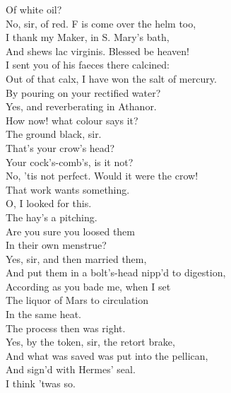 \documentclass{memoir}
\begin{document}
\begin{drama*}
\mammonspeaks {} Of white oil?\\
\subtlespeaks  No, sir, of red. F is come over the helm too,\\
 I thank my Maker, in S. Mary's bath,\\
 And shews lac virginis. Blessed be heaven!\\
 I sent you of his faeces there calcined:\\
 Out of that calx, I have won the salt of mercury.\\
\mammonspeaks  By pouring on your rectified water?\\
\subtlespeaks  Yes, and reverberating in Athanor.\\
 How now! what colour says it?\\
\facespeaks {} The ground black, sir.\\
\mammonspeaks  That's your crow's head?\\
\surlyspeaks {} Your cock's-comb's, is it not?\\
\subtlespeaks  No, 'tis not perfect. Would it were the crow!\\
 That work wants something.\\
\surlyspeaks {} O, I looked for this.\\
 The hay's a pitching.\\
\subtlespeaks {} Are you sure you loosed them\\
 In their own menstrue?\\
\facespeaks {} Yes, sir, and then married them,\\
 And put them in a bolt's-head nipp'd to digestion,\\
 According as you bade me, when I set\\
 The liquor of Mars to circulation\\
 In the same heat.\\
\subtlespeaks {} The process then was right.\\
\facespeaks  Yes, by the token, sir, the retort brake,\\
 And what was saved was put into the pellican,\\
 And sign'd with Hermes' seal.\\
\subtlespeaks {} I think 'twas so.\\

\end{drama*}
\end{document}
